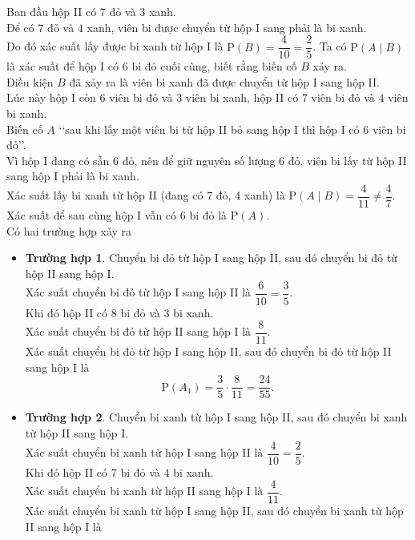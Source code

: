 \begin{ex}
{\begin{itemchoice}
			Ban đầu hộp II có $7$ đỏ và $3$ xanh.\\ Để có $7$ đỏ và $4$ xanh, viên bi được chuyển từ hộp I sang phải là bi xanh.\\
			Do đó xác suất lấy được bi xanh từ hộp I là $\mathrm{P}(B) = \dfrac{4}{10} = \dfrac{2}{5}$.
			\itemch Ta có $\mathrm{P}(A\mid B)$ là xác suất để hộp I có $6$ bi đỏ cuối cùng, biết rằng biến cố $B$ xảy ra.\\
			Điều kiện $B$ đã xảy ra là viên bi xanh đã được chuyển từ hộp I sang hộp II.\\
			Lúc này hộp I còn $6$ viên bi đỏ và $3$ viên bi xanh, hộp II có $7$ viên bi đỏ và $4$ viên bi xanh.\\
			Biến cố $A$ \lq\lq sau khi lấy một viên bi từ hộp II bỏ sang hộp I thì hộp I có $6$ viên bi đỏ\rq\rq.\\
			Vì hộp I đang có sẵn $6$ đỏ, nên để giữ nguyên số lượng $6$ đỏ, viên bi lấy từ hộp II sang hộp I phải là bi xanh.\\
			Xác suất lấy bi xanh từ hộp II (đang có $7$ đỏ, $4$ xanh) là $\mathrm{P}(A\mid B)=\dfrac{4}{11}\ne \dfrac{4}{7}$.
			\itemch Xác suất để sau cùng hộp I vẫn có $6$ bi đỏ là $\mathrm{P}(A)$.\\
			Có hai trường hợp xảy ra
			\begin{itemize}
				\item \textbf{Trường hợp 1}. Chuyển bi đỏ từ hộp I sang hộp II, sau đó chuyển bi đỏ từ hộp II sang hộp I.\\
				Xác suất chuyển bi đỏ từ hộp I sang hộp II là $\dfrac{6}{10}=\dfrac{3}{5}$.\\
				Khi đó hộp II có $8$ bi đỏ và $3$ bi xanh.\\
				Xác suất chuyển bi đỏ từ hộp II sang hộp I là $\dfrac{8}{11}$.\\
				Xác suất chuyển bi đỏ từ hộp I sang hộp II, sau đó chuyển bi đỏ từ hộp II sang hộp I là
				\[\mathrm{P}\left(A_1\right)=\dfrac{3}{5}\cdot\dfrac{8}{11}=\dfrac{24}{55}.\]
				\item \textbf{Trường hợp 2}. Chuyển bi xanh từ hộp I sang hộp II, sau đó chuyển bi xanh từ hộp II sang hộp I.\\
				Xác suất chuyển bi xanh từ hộp I sang hộp II là $\dfrac{4}{10}=\dfrac{2}{5}$.\\
				Khi đó hộp II có $7$ bi đỏ và $4$ bi xanh.\\
				Xác suất chuyển bi xanh từ hộp II sang hộp I là $\dfrac{4}{11}$.\\
				Xác suất chuyển bi xanh từ hộp I sang hộp II, sau đó chuyển bi xanh từ hộp II sang hộp I là

\end{itemize}
\end{itemchoice}}
\end{ex}
